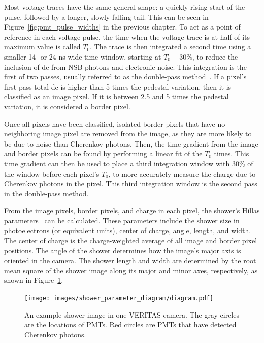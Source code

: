 Most voltage traces have the same general shape: a quickly rising start of the pulse, followed by a longer, slowly falling tail.
This can be seen in Figure~\ref{fig:pmt_pulse_widths} in the previous chapter.
To act as a point of reference in each voltage pulse, the time when the voltage trace is at half of its maximum value is called $T_{0}$.
The trace is then integrated a second time using a smaller 14- or 24-ns-wide time window, starting at $T_0 - 30\%$, to reduce the inclusion of dc from NSB photons and electronic noise.
This integration is the first of two passes, usually referred to as the double-pass method~\cite{doublepass}.
If a pixel's first-pass total dc is higher than 5 times the pedestal variation, then it is classified as an image pixel.
If it is between 2.5 and 5 times the pedestal variation, it is considered a border pixel.

Once all pixels have been classified, isolated border pixels that have no neighboring image pixel are removed from the image, as they are more likely to be due to noise than Cherenkov photons.
Then, the time gradient from the image and border pixels can be found by performing a linear fit of the $T_{0}$ times.
This time gradient can then be used to place a third integration window 
with 30\% of the window before each pixel's $T_{0}$, to more accurately measure the charge due to Cherenkov photons in the pixel.
This third integration window is the second pass in the double-pass method.

From the image pixels, border pixels, and charge in each pixel, the shower's Hillas parameters~\cite{hillas_params} can be calculated.
These parameters include the shower size in photoelectrons (or equivalent units), center of charge, angle, length, and width.
The center of charge is the charge-weighted average of all image and border pixel positions.
The angle of the shower determines how the image's major axis is oriented in the camera.
The shower length and width are determined by the root mean square of the shower image along its major and minor axes, respectively, as shown in Figure~\ref{fig:shower_param}.
  
\begin{figure}[t]
  \centering
  \texttt{[image: images/shower\_parameter\_diagram/diagram.pdf]}
  \caption[Basic Shower Diagram]{
    An example shower image in one VERITAS camera.
    The gray circles are the locations of PMTs.
    Red circles are PMTs that have detected Cherenkov photons.
  }
  \label{fig:shower_param}
\end{figure}
\FloatBarrier

